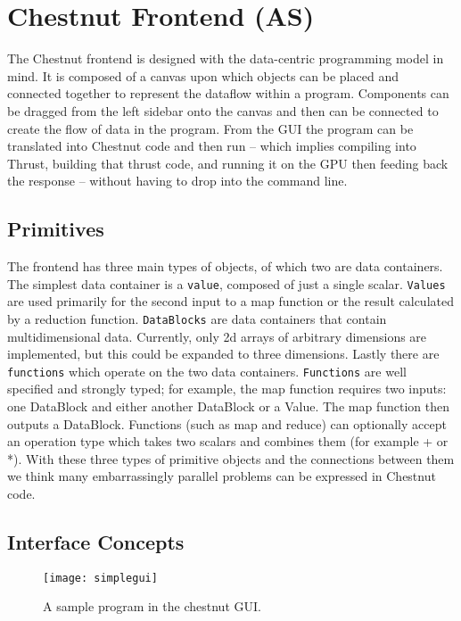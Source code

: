 \documentclass[twocolumn]{article}
\renewcommand{\|}{\origbar} %
\newcommand{\code}[1]{\texttt{#1}}
\begin{document}
\section{Chestnut Frontend (AS)}
\label{sec:chestnutFrontend}

The Chestnut frontend is designed with the data-centric programming model in mind. It is composed of a canvas upon which objects can be placed and connected together to represent the dataflow within a program. Components can be dragged from the left sidebar onto the canvas and then can be connected to create the flow of data in the program. From the GUI the program can be translated into Chestnut code and then run -- which implies compiling into Thrust, building that thrust code, and running it on the GPU then feeding back the response -- without having to drop into the command line.

\subsection{Primitives}

The frontend has three main types of objects, of which two are data containers. The simplest data container is a \code{value}, composed of just a single scalar. \code{Values} are used primarily for the second input to a map function or the result calculated by a reduction function. \code{DataBlocks} are data containers that contain multidimensional data. Currently, only 2d arrays of arbitrary dimensions are implemented, but this could be expanded to three dimensions. Lastly there are \code{functions} which operate on the two data containers. \code{Functions} are well specified and strongly typed; for example, the map function requires two inputs: one DataBlock and either another DataBlock or a Value. The map function then outputs a DataBlock. Functions (such as map and reduce) can optionally accept an operation type which takes two scalars and combines them (for example + or *). With these three types of primitive objects and the connections between them we think many embarrassingly parallel problems can be expressed in Chestnut code.

\subsection{Interface Concepts}

\begin{figure}[h!]
  \centering
    \texttt{[image: simplegui]}
  \caption{A sample program in the chestnut GUI.}
\end{figure}
\end{document}
